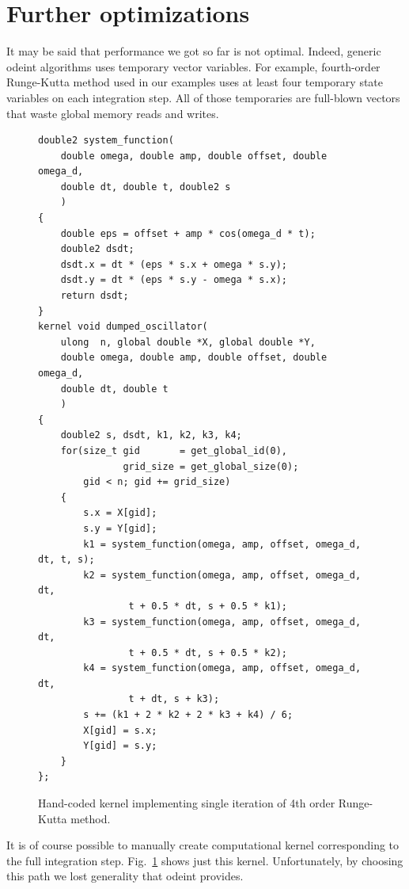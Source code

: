 \documentclass[1p]{elsarticle}
\newcommand{\figref}[1]{Fig.~\ref{#1}}
\begin{document}
\section{Further optimizations}

It may be said that performance we got so far is not optimal. Indeed, generic
odeint algorithms uses temporary vector variables. For example, fourth-order
Runge-Kutta method used in our examples uses at least four temporary state
variables on each integration step. All of those temporaries are full-blown
vectors that waste global memory reads and writes. 

\begin{figure}
\begin{lstlisting}
double2 system_function(
    double omega, double amp, double offset, double omega_d,
    double dt, double t, double2 s
    )
{
    double eps = offset + amp * cos(omega_d * t);
    double2 dsdt;
    dsdt.x = dt * (eps * s.x + omega * s.y);
    dsdt.y = dt * (eps * s.y - omega * s.x);
    return dsdt;
}
kernel void dumped_oscillator(
    ulong  n, global double *X, global double *Y,
    double omega, double amp, double offset, double omega_d,
    double dt, double t
    )
{
    double2 s, dsdt, k1, k2, k3, k4;
    for(size_t gid       = get_global_id(0),
               grid_size = get_global_size(0);
        gid < n; gid += grid_size)
    {
        s.x = X[gid];
        s.y = Y[gid];
        k1 = system_function(omega, amp, offset, omega_d, dt, t, s);
        k2 = system_function(omega, amp, offset, omega_d, dt,
                t + 0.5 * dt, s + 0.5 * k1);
        k3 = system_function(omega, amp, offset, omega_d, dt,
                t + 0.5 * dt, s + 0.5 * k2);
        k4 = system_function(omega, amp, offset, omega_d, dt,
                t + dt, s + k3);
        s += (k1 + 2 * k2 + 2 * k3 + k4) / 6;
        X[gid] = s.x;
        Y[gid] = s.y;
    }
};

\end{lstlisting}
\caption{Hand-coded kernel implementing single iteration of 4th order
Runge-Kutta method.}
\label{code:customkrn}
\end{figure}

It is of course possible to manually create computational kernel corresponding
to the full integration step. \figref{code:customkrn} shows just this
kernel. Unfortunately, by choosing this path we lost generality that odeint
provides.
\end{document}
